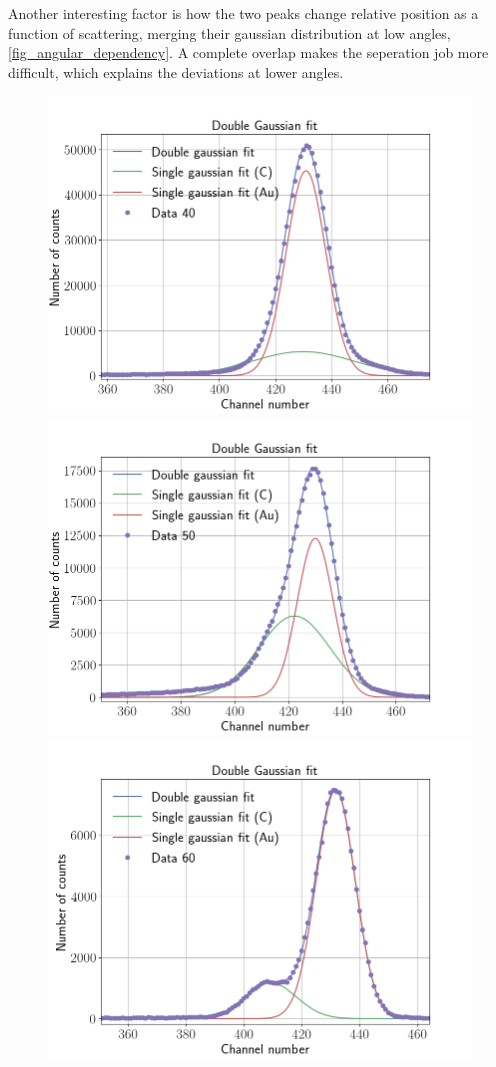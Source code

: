 Another interesting factor is how the two peaks change relative position as a
function of scattering, merging their gaussian distribution at low angles, \cref{fig_angular_dependency}. A complete overlap makes the seperation job more difficult, which explains the deviations at lower angles.


\begin{figure}
\centering
\includegraphics[width=0.99\columnwidth]{Data_40}
\includegraphics[width=0.99\columnwidth]{Data_50}
\includegraphics[width=0.99\columnwidth]{Data_60}

\end{figure}
